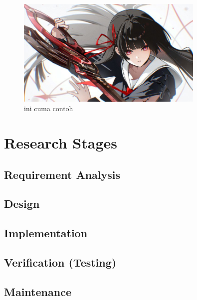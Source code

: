 	\begin{figure}[h!]
		\centering
		\includegraphics[width=0.8\textwidth]{assets/contoh.jpg}
		\caption{ini cuma contoh}
		\label{fig:contoh-f}
	\end{figure}
	
	\section{Research Stages}
	\setlength{\leftskip}{1.4cm}
		\subsection{Requirement Analysis}
		\lipsum[1]
		
		\subsection{Design}
		\lipsum[1]
		
		\subsection{Implementation}
		\lipsum[1]
		
		\subsection{Verification (Testing)}
		\lipsum[1]
		
		\subsection{Maintenance}
		\lipsum[1]
			